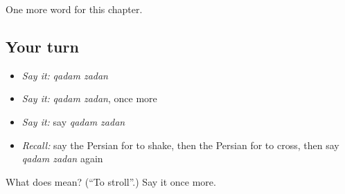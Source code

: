 \begin{grammarlens}[title={What you've built}]
One more word for this chapter.
\end{grammarlens}

\subsection*{Your turn}
\begin{itemize}
\raggedright
  \item \emph{Say it:} \emph{qadam zadan}
  \item \emph{Say it:} \emph{qadam zadan}, once more
  \item \emph{Say it:} say \emph{qadam zadan}
  \item \emph{Recall:} say the Persian for to shake, then the Persian for to cross, then say \emph{qadam zadan} again
\end{itemize}

\begin{tcolorbox}[breakable,colback=teal!4,colframe=teal!35!black,title={Before you move on}]
What does   mean? (\textquotedblleft{}To stroll\textquotedblright{}.) Say it once more.
\end{tcolorbox}
